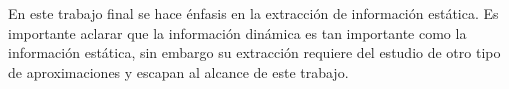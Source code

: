 \documentclass[a4paper,12pt]{report}
\begin{document}
%
%
% 
%







En este trabajo final se hace énfasis en la extracción de información estática. Es importante aclarar que la información dinámica es tan importante como la información estática, sin embargo su extracción requiere del estudio de otro tipo de aproximaciones y escapan al alcance de este trabajo.
\end{document}
